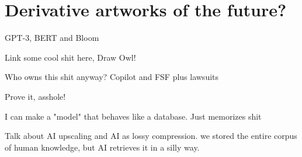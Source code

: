 \setchapterpreamble[u]{\margintoc}
\chapter{Derivative artworks of the future?}

GPT-3, BERT and Bloom

Link some cool shit here, Draw Owl!

Who owns this shit anyway? Copilot and FSF plus lawsuits

Prove it, asshole!

I can make a "model" that behaves like a database. Just memorizes shit

Talk about AI upscaling and AI as lossy compression. we stored the entire corpus of human knowledge, but AI retrieves it in a silly way.
